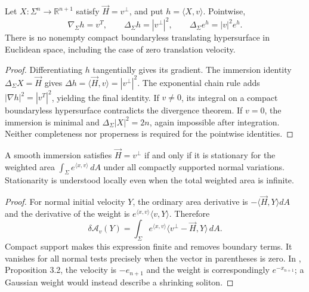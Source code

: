 \begin{proposition}\label{prop:translator-height-example}
Let $X:\Sigma^n\to\mathbb R^{n+1}$ satisfy $\vec H=v^\perp$, and put $h=\langle X,v\rangle$. Pointwise,
\[
 \nabla_\Sigma h=v^T,\qquad \Delta_\Sigma h=|v^\perp|^2,
 \qquad \Delta_\Sigma e^h=|v|^2 e^h.
\]
There is no nonempty compact boundaryless translating hypersurface in Euclidean space, including the case of zero translation velocity.
\end{proposition}
\begin{proof}
Differentiating $h$ tangentially gives its gradient. The immersion identity $\Delta_\Sigma X=\vec H$ gives $\Delta h=\langle\vec H,v\rangle=|v^\perp|^2$. The exponential chain rule adds $|\nabla h|^2=|v^T|^2$, yielding the final identity. If $v\ne0$, its integral on a compact boundaryless hypersurface contradicts the divergence theorem. If $v=0$, the immersion is minimal and $\Delta_\Sigma|X|^2=2n$, again impossible after integration. Neither completeness nor properness is required for the pointwise identities.
\end{proof}

\begin{proposition}\label{prop:translator-weighted-area-example}
A smooth immersion satisfies $\vec H=v^\perp$ if and only if it is stationary for the weighted area $\int_\Sigma e^{\langle x,v\rangle}\,dA$ under all compactly supported normal variations. Stationarity is understood locally even when the total weighted area is infinite.
\end{proposition}
\begin{proof}
For normal initial velocity $Y$, the ordinary area derivative is $-\langle\vec H,Y\rangle dA$ and the derivative of the weight is $e^{\langle x,v\rangle}\langle v,Y\rangle$. Therefore
\[
 \delta\mathcal A_v(Y)=\int_\Sigma
 e^{\langle x,v\rangle}\langle v^\perp-\vec H,Y\rangle\,dA.
\]
Compact support makes this expression finite and removes boundary terms. It vanishes for all normal tests precisely when the vector in parentheses is zero. In \cite{HIMW19}, Proposition 3.2, the velocity is $-e_{n+1}$ and the weight is correspondingly $e^{-x_{n+1}}$; a Gaussian weight would instead describe a shrinking soliton.
\end{proof}

